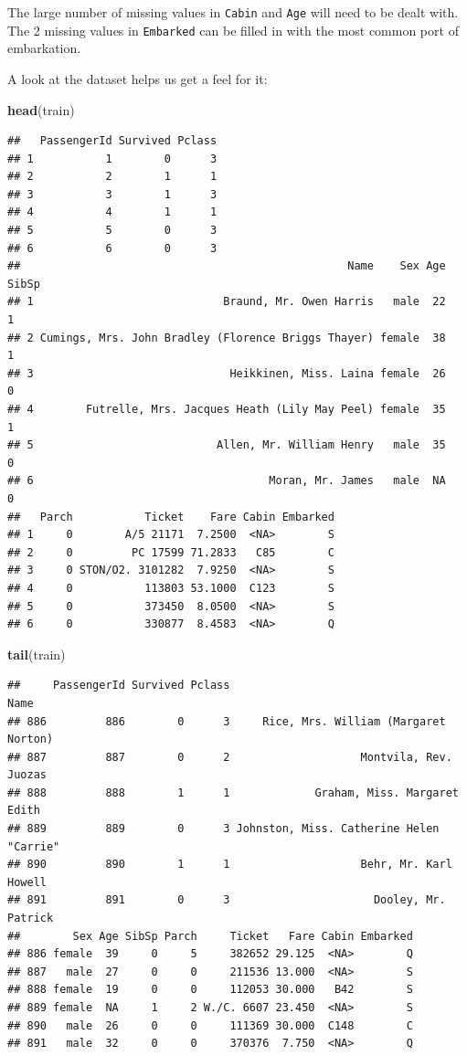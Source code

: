 \documentclass[]{article}
\newenvironment{Shaded}{\begin{snugshade}}{\end{snugshade}}
\newcommand{\KeywordTok}[1]{\textcolor[rgb]{0.13,0.29,0.53}{\textbf{#1}}}
\newcommand{\NormalTok}[1]{#1}
\begin{document}
The large number of missing values in \texttt{Cabin} and \texttt{Age}
will need to be dealt with. The 2 missing values in \texttt{Embarked}
can be filled in with the most common port of embarkation.

A look at the dataset helps us get a feel for it:

\begin{Shaded}
\begin{Highlighting}[]
\KeywordTok{head}\NormalTok{(train)}
\end{Highlighting}
\end{Shaded}

\begin{verbatim}
##   PassengerId Survived Pclass
## 1           1        0      3
## 2           2        1      1
## 3           3        1      3
## 4           4        1      1
## 5           5        0      3
## 6           6        0      3
##                                                  Name    Sex Age SibSp
## 1                             Braund, Mr. Owen Harris   male  22     1
## 2 Cumings, Mrs. John Bradley (Florence Briggs Thayer) female  38     1
## 3                              Heikkinen, Miss. Laina female  26     0
## 4        Futrelle, Mrs. Jacques Heath (Lily May Peel) female  35     1
## 5                            Allen, Mr. William Henry   male  35     0
## 6                                    Moran, Mr. James   male  NA     0
##   Parch           Ticket    Fare Cabin Embarked
## 1     0        A/5 21171  7.2500  <NA>        S
## 2     0         PC 17599 71.2833   C85        C
## 3     0 STON/O2. 3101282  7.9250  <NA>        S
## 4     0           113803 53.1000  C123        S
## 5     0           373450  8.0500  <NA>        S
## 6     0           330877  8.4583  <NA>        Q
\end{verbatim}

\begin{Shaded}
\begin{Highlighting}[]
\KeywordTok{tail}\NormalTok{(train)}
\end{Highlighting}
\end{Shaded}

\begin{verbatim}
##     PassengerId Survived Pclass                                     Name
## 886         886        0      3     Rice, Mrs. William (Margaret Norton)
## 887         887        0      2                    Montvila, Rev. Juozas
## 888         888        1      1             Graham, Miss. Margaret Edith
## 889         889        0      3 Johnston, Miss. Catherine Helen "Carrie"
## 890         890        1      1                    Behr, Mr. Karl Howell
## 891         891        0      3                      Dooley, Mr. Patrick
##        Sex Age SibSp Parch     Ticket   Fare Cabin Embarked
## 886 female  39     0     5     382652 29.125  <NA>        Q
## 887   male  27     0     0     211536 13.000  <NA>        S
## 888 female  19     0     0     112053 30.000   B42        S
## 889 female  NA     1     2 W./C. 6607 23.450  <NA>        S
## 890   male  26     0     0     111369 30.000  C148        C
## 891   male  32     0     0     370376  7.750  <NA>        Q
\end{verbatim}
\end{document}
